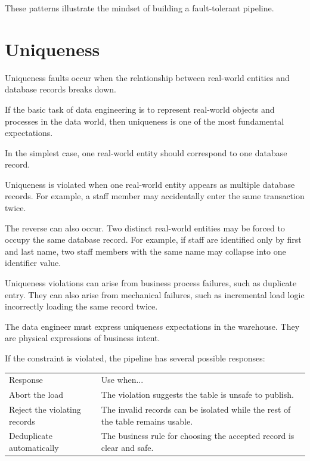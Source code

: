 \documentclass[10pt,openany,10pt]{book}
\newcounter{none}
\let\podeToprule\toprule
\let\podeMidrule\midrule
\let\podeBottomrule\bottomrule
\renewcommand{\toprule}{\arrayrulecolor{pbiGrid}\podeToprule}
\renewcommand{\midrule}{\arrayrulecolor{pbiGrid}\podeMidrule}
\renewcommand{\bottomrule}{\arrayrulecolor{pbiGrid}\podeBottomrule}
\begin{document}
These patterns illustrate the mindset of building a fault-tolerant
pipeline.

\section{Uniqueness}\label{uniqueness}

Uniqueness faults occur when the relationship between real-world
entities and database records breaks down.

If the basic task of data engineering is to represent real-world objects
and processes in the data world, then uniqueness is one of the most
fundamental expectations.

In the simplest case, one real-world entity should correspond to one
database record.

Uniqueness is violated when one real-world entity appears as multiple
database records. For example, a staff member may accidentally enter the
same transaction twice.

The reverse can also occur. Two distinct real-world entities may be
forced to occupy the same database record. For example, if staff are
identified only by first and last name, two staff members with the same
name may collapse into one identifier value.

Uniqueness violations can arise from business process failures, such as
duplicate entry. They can also arise from mechanical failures, such as
incremental load logic incorrectly loading the same record twice.

The data engineer must express uniqueness expectations in the warehouse.
They are physical expressions of business intent.

If the constraint is violated, the pipeline has several possible
responses:

{\def\LTcaptype{none} %
\begin{longtable}[]{@{}
  >{\raggedright\arraybackslash}p{}
  >{\raggedright\arraybackslash}p{}@{}}
\toprule\noalign{}
\begin{minipage}[b]{\linewidth}\raggedright
Response
\end{minipage} & \begin{minipage}[b]{\linewidth}\raggedright
Use when...
\end{minipage} \\
\midrule\noalign{}
\endhead
\bottomrule\noalign{}
\endlastfoot
Abort the load & The violation suggests the table is unsafe to
publish. \\
Reject the violating records & The invalid records can be isolated while
the rest of the table remains usable. \\
Deduplicate automatically & The business rule for choosing the accepted
record is clear and safe. \\
\end{longtable}
}
\end{document}
